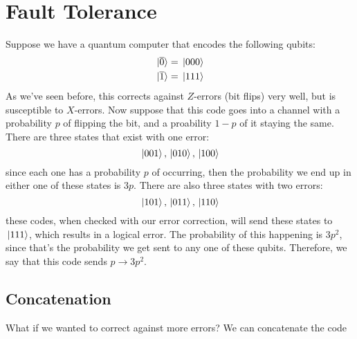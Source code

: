 \setcounter{section}{17}
\section{Fault Tolerance}
Suppose we have a quantum computer that encodes the following qubits:
\begin{align*}
	\ket*{\overline 0} &= \ket*{000}\\
	\ket*{\overline 1} &= \ket*{111} 
\end{align*}
As we've seen before, this corrects against \( Z \)-errors (bit flips) very well, but is susceptible to \( X \)-errors.
Now suppose that this code goes into a channel with a probability \( p \) of flipping the bit, and a proability 
\( 1-p \) of it staying the same. There are three states that exist with one error:
\[
\ket*{001}, \ket*{010}, \ket*{100}
\] 
since each one has a probability \( p \) of occurring, then the probability we end up in either one of these states 
is \( 3p \). There are also three states with two errors:
\[
\ket*{101}, \ket*{011}, \ket*{110}
\] 
these codes, when checked with our error correction, will send these states to \( \ket*{111} \), which 
results in a logical error. The probability of this happening is \( 3p^2 \), since that's the probability 
we get sent to any one of these qubits. Therefore, we say that this code sends \( p \to 3p^2\).   



\subsection{Concatenation} 
What if we wanted to correct against more errors? We can concatenate the code 
